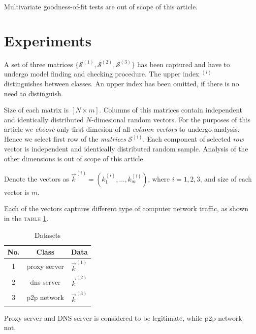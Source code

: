 \documentclass[a4paper,journal]{IEEEtran}
\begin{document}
Multivariate goodness-of-fit tests are out of scope of this article.%

\section{Experiments}\label{sec:exp}
A set of three matrices  $\{\mathcal{S}^{(1)},\mathcal{S}^{(2)},\mathcal{S}^{(3)}\}$ has been captured and
have to undergo model finding and checking procedure. The upper index $^{(i)}$ distinguishes between classes.
An upper index has been omitted, if there is no need to distinguish.

Size of each matrix is $[N \times m]$.
Columns of this matrices contain independent and identically distributed $N$-dimesional random vectors.
For the purposes of this article we \emph{choose} only first dimesion of all \emph{column vectors} to undergo analysis.
Hence we select first row of the \emph{matrices} $\mathcal{S}^{(i)}$.
Each component of selected \emph{row} vector is independent and identically distributed random sample.
Analysis of the other dimensions is out of scope of this article.

Denote the vectors as ${\vec k^{(i)}}=( k^{(i)}_1,\ldots,k^{(i)}_{m})$, 
where $i=1,2,3$, and  size of each vector is $m$.

Each of the vectors captures different type of computer network traffic, as shown in the
\textsc{table \ref{tbl:data}}.

\begin{table}[!h]
\caption{Datasets}
\begin{center}
\begin{tabular}{|c|c|c|}\hline
\textbf{No.} & \textbf{Class} & \textbf{Data} \\ \hline
1 & proxy server & $\vec{k}^{(1)}$ \\ \hline
2 & dns server & $\vec{k}^{(2)}$ \\ \hline
3 & p2p network & $\vec{k}^{(3)}$ \\ \hline
\end{tabular}
\end{center}
\label{tbl:data}
\end{table}

Proxy server and DNS server is considered to be legitimate, while p2p network not.
\end{document}
